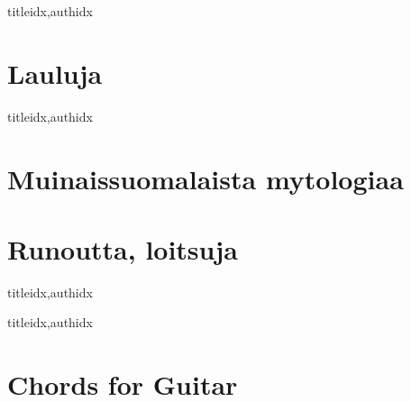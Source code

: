 \documentclass[twoside,10pt]{book}
\renewcommand{\lyricfont}{\sffamily\Large} %
\begin{document}
  \clearpage\scleardpage
    \begin{songs}{titleidx,authidx}
      \setcounter{songnum}{400}
      
    \end{songs}
    
  \clearpage\scleardpage
    \begin{otherlanguage}{finnish} %
      \section{Lauluja}
        \begin{songs}{titleidx,authidx}
          \setcounter{songnum}{700}
          
          
        \end{songs}
      \clearpage\scleardpage
      \section{Muinaissuomalaista mytologiaa}
        
      \clearpage\scleardpage
      \section{Runoutta, loitsuja}
        \begin{songs}{titleidx,authidx}
          \setcounter{songnum}{800}
          \chordsoff %
          \renewcommand{\lyricfont}{\sffamily\small} %
          
          \renewcommand{\lyricfont}{\sffamily\Large} %
          \chordson
        \end{songs}
    \end{otherlanguage}
  \clearpage\scleardpage
    \begin{songs}{titleidx,authidx}
      \setcounter{songnum}{900}
      
    \end{songs}      

  \clearpage\scleardpage
    \section{Chords for Guitar}
       \\
      
  
  \clearpage
\end{document}
